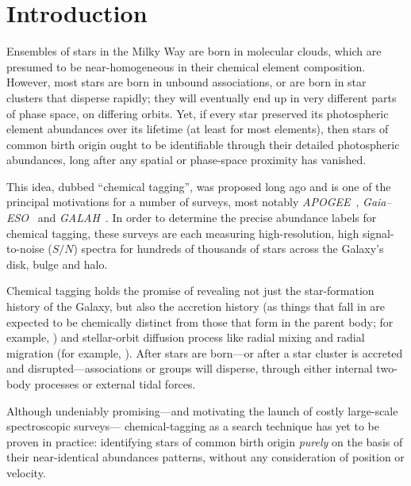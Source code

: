 \documentclass[12pt, letterpaper, preprint]{aastex}
\newcommand{\acronym}[1]{{\small{#1}}}
\newcommand{\project}[1]{\textsl{#1}}
\newcommand{\apogee}{\project{\acronym{APOGEE}}}
\newcommand{\gaiaeso}{\project{Gaia--\acronym{ESO}}}
\newcommand{\galah}{\project{\acronym{GALAH}}}
\begin{document}

\clearpage
\section{Introduction}\label{sec:intro}

Ensembles of stars in the Milky Way are born in molecular clouds,
which are presumed to be near-homogeneous in their chemical element
composition.
However, most stars are born in unbound associations, or are born in
star clusters that disperse rapidly; they will eventually end up in
very different parts of phase space, on differing orbits.
Yet, if every star preserved its photospheric element abundances over
its lifetime (at least for most elements), then stars of common birth
origin ought to be identifiable through their detailed photospheric
abundances, long after any spatial or phase-space proximity has
vanished.

This idea, dubbed ``chemical tagging'', was proposed long ago
\citep{freeman} and is one of the principal motivations for a number
of surveys, most notably \apogee\ \citep{apogee},
\gaiaeso\ \citep{gaiaeso} and \galah\ \citep{galah}.
In order to determine the precise abundance labels for chemical
tagging, these surveys are each measuring high-resolution, high
signal-to-noise ($S/N$) spectra for hundreds of thousands of stars across the
Galaxy's disk, bulge and halo.

Chemical tagging holds the promise of revealing not just the
star-formation history of the Galaxy, but also the accretion history
(as things that fall in are expected to be chemically distinct from
those that form in the parent body; for example, \citealt{font}) and
stellar-orbit diffusion process like radial mixing and radial
migration (for example, \citealt{roskar, quillen}).  After
stars are born---or after a star cluster is accreted and
disrupted---associations or groups will disperse, through either
internal two-body processes or external tidal forces.

Although undeniably promising---and motivating the 
launch of costly large-scale spectroscopic surveys---
chemical-tagging as a search technique has yet to be proven in
practice: identifying stars of common birth origin {\it purely} on the
basis of their near-identical abundances patterns, without any
consideration of position or velocity.
\end{document}
